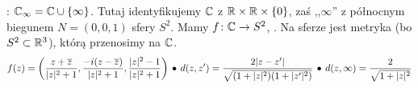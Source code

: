 : $\mathbb{C}_\infty = \mathbb{C} \cup \{\infty\}$. 
Tutaj identyfikujemy $\mathbb{C}$ z $\mathbb{R}\times\mathbb{R}\times\{0\}$, zaś ,,$\infty$'' z północnym biegunem $N = (0,0,1)$ sfery $S^2$.
Mamy $f \colon \mathbb{C} \to S^2$, .
Na sferze jest metryka (bo $S^2 \subset \mathbb{R}^3$), którą przenosimy na $\mathbb{C}$.
\[
	f(z) = \left(\frac{z+ \overline{z}}{|z|^2+1}, \frac{-i(z-\overline{z})}{|z|^2+1}, \frac{|z|^2-1}{|z|^2+1} \right) \, \bullet \,
	d(z, z') = \frac{2|z-z'|}{\sqrt{(1+|z|^2)(1+|z'|^2)}} \, \bullet \,
	d(z, \infty)= \frac{2}{\sqrt{1+|z|^2}}
\]